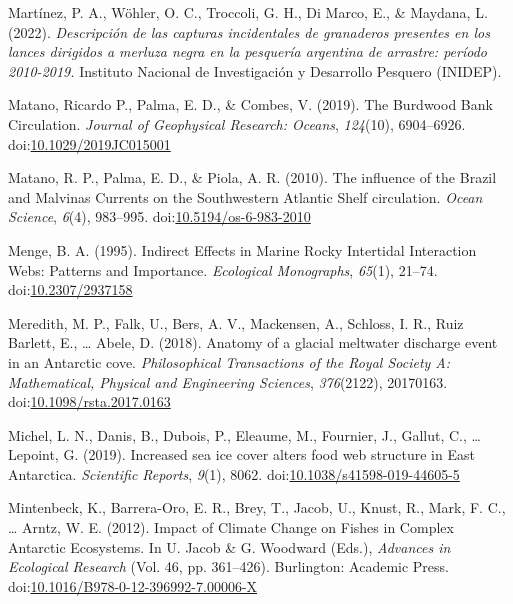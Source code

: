 \documentclass[
]{article}
\newlength{\cslhangindent}
\newlength{\cslentryspacingunit} %
\newenvironment{CSLReferences}[2] %
 {%
  \setlength{\parindent}{0pt}
  \ifodd #1
  \let\oldpar\par
  \def\par{\hangindent=\cslhangindent\oldpar}
  \fi
  \setlength{\parskip}{#2\cslentryspacingunit}
 }%
 {}
\begin{document}
\begin{CSLReferences}{1}{0}
\leavevmode{}%
Martínez, P. A., Wöhler, O. C., Troccoli, G. H., Di Marco, E., \&
Maydana, L. (2022). \emph{{Descripción de las capturas incidentales de
granaderos presentes en los lances dirigidos a merluza negra en la
pesquería argentina de arrastre: período 2010-2019.}} {Instituto
Nacional de Investigación y Desarrollo Pesquero (INIDEP)}.

\leavevmode{}%
Matano, Ricardo P., Palma, E. D., \& Combes, V. (2019). The {Burdwood
Bank Circulation}. \emph{Journal of Geophysical Research: Oceans},
\emph{124}(10), 6904--6926.
doi:\href{https://doi.org/10.1029/2019JC015001}{10.1029/2019JC015001}

\leavevmode{}%
Matano, R. P., Palma, E. D., \& Piola, A. R. (2010). The influence of
the {Brazil} and {Malvinas Currents} on the {Southwestern Atlantic
Shelf} circulation. \emph{Ocean Science}, \emph{6}(4), 983--995.
doi:\href{https://doi.org/10.5194/os-6-983-2010}{10.5194/os-6-983-2010}

\leavevmode{}%
Menge, B. A. (1995). Indirect {Effects} in {Marine Rocky Intertidal
Interaction Webs}: {Patterns} and {Importance}. \emph{Ecological
Monographs}, \emph{65}(1), 21--74.
doi:\href{https://doi.org/10.2307/2937158}{10.2307/2937158}

\leavevmode{}%
Meredith, M. P., Falk, U., Bers, A. V., Mackensen, A., Schloss, I. R.,
Ruiz Barlett, E., \ldots{} Abele, D. (2018). Anatomy of a glacial
meltwater discharge event in an {Antarctic} cove. \emph{Philosophical
Transactions of the Royal Society A: Mathematical, Physical and
Engineering Sciences}, \emph{376}(2122), 20170163.
doi:\href{https://doi.org/10.1098/rsta.2017.0163}{10.1098/rsta.2017.0163}

\leavevmode{}%
Michel, L. N., Danis, B., Dubois, P., Eleaume, M., Fournier, J., Gallut,
C., \ldots{} Lepoint, G. (2019). Increased sea ice cover alters food web
structure in {East Antarctica}. \emph{Scientific Reports}, \emph{9}(1),
8062.
doi:\href{https://doi.org/10.1038/s41598-019-44605-5}{10.1038/s41598-019-44605-5}

\leavevmode{}%
Mintenbeck, K., Barrera-Oro, E. R., Brey, T., Jacob, U., Knust, R.,
Mark, F. C., \ldots{} Arntz, W. E. (2012). Impact of {Climate Change} on
{Fishes} in {Complex Antarctic Ecosystems}. In U. Jacob \& G. Woodward
(Eds.), \emph{Advances in {Ecological Research}} (Vol. 46, pp.
361--426). {Burlington}: {Academic Press}.
doi:\href{https://doi.org/10.1016/B978-0-12-396992-7.00006-X}{10.1016/B978-0-12-396992-7.00006-X}


\end{CSLReferences}
\end{document}
